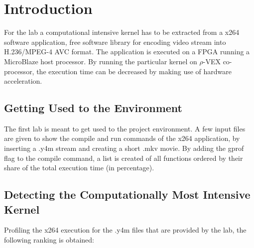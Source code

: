 
\section{Introduction}

For the lab a computational intensive kernel has to be extracted from a x264 software application, free software library for encoding video stream into H.236/MPEG-4 AVC format. The application is executed on a FPGA running a MicroBlaze host processor. By running the particular kernel on $\rho$-VEX co-processor, the execution time can be decreased by making use of hardware acceleration. 

\subsection{Getting Used to the Environment}
The first lab is meant to get used to the project environment. A few input files are given to show the compile and run commands of the x264 application, by inserting a .y4m stream and creating a short .mkv movie. By adding the gprof flag to the compile command, a list is created of all functions ordered by their share of the total execution time (in percentage). 

\subsection{Detecting the Computationally Most Intensive Kernel}

Profiling the x264 execution for the .y4m files that are provided by the lab, the following ranking is obtained:

